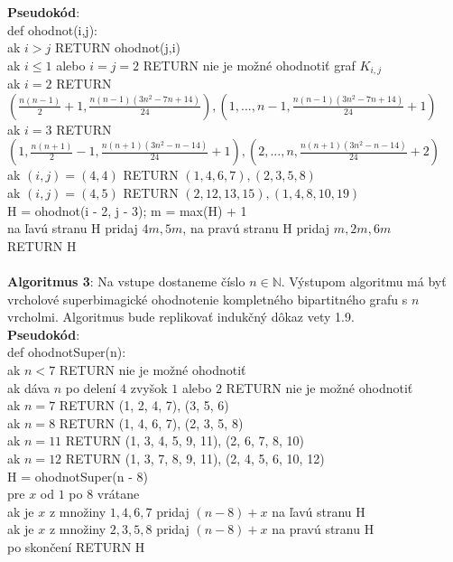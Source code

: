 \documentclass[12pt]{article}
\begin{document}
\textbf{Pseudokód}: \\
def ohodnot(i,j): \\
ak $i > j$ RETURN ohodnot(j,i) \\
ak $i \leq 1$ alebo $i = j = 2$ RETURN nie je možné ohodnotiť graf $K_{i,j}$ \\
ak $i = 2$ RETURN $(\frac{n(n-1)}{2} + 1, \frac{n(n-1)(3n^2-7n+14)}{24}), (1, ... , n-1, \frac{n(n-1)(3n^2-7n+14)}{24} + 1)$ \\
ak $i = 3$ RETURN $(1, \frac{n(n+1)}{2} - 1, \frac{n(n+1)(3n^2-n-14)}{24} + 1), (2, ... , n, \frac{n(n+1)(3n^2-n-14)}{24} + 2)$ \\
ak $(i, j) = (4,4)$ RETURN $(1, 4, 6, 7), (2, 3, 5, 8)$ \\
ak $(i, j) = (4,5)$ RETURN $(2, 12, 13, 15), (1, 4, 8, 10, 19)$ \\
H = ohodnot(i - 2, j - 3); m = max(H) + 1 \\
na ľavú stranu H pridaj $4m, 5m$, na pravú stranu H pridaj $m, 2m, 6m$ \\
RETURN H \\\\

\textbf{Algoritmus 3}: Na vstupe dostaneme číslo $n \in \mathbb{N}$. Výstupom algoritmu má byť vrcholové superbimagické ohodnotenie kompletného bipartitného grafu s $n$ vrcholmi. Algoritmus bude replikovať indukčný dôkaz vety 1.9. \\

\textbf{Pseudokód}: \\
def ohodnotSuper(n): \\
ak $n < 7$ RETURN nie je možné ohodnotiť \\
ak dáva $n$ po delení $4$ zvyšok $1$ alebo $2$ RETURN nie je možné ohodnotiť \\
ak $n = 7$ RETURN (1, 2, 4, 7), (3, 5, 6) \\
ak $n = 8$ RETURN (1, 4, 6, 7), (2, 3, 5, 8) \\
ak $n = 11$ RETURN (1, 3, 4, 5, 9, 11), (2, 6, 7, 8, 10) \\
ak $n = 12$ RETURN (1, 3, 7, 8, 9, 11), (2, 4, 5, 6, 10, 12) \\
H = ohodnotSuper(n - 8) \\
pre $x$ od $1$ po $8$ vrátane \\
ak je $x$ z množiny $1, 4, 6, 7$ pridaj $(n-8)+x$ na ľavú stranu H \\
ak je $x$ z množiny $2, 3, 5, 8$ pridaj $(n-8)+x$ na pravú stranu H \\
po skončení RETURN H \\\\
\end{document}
